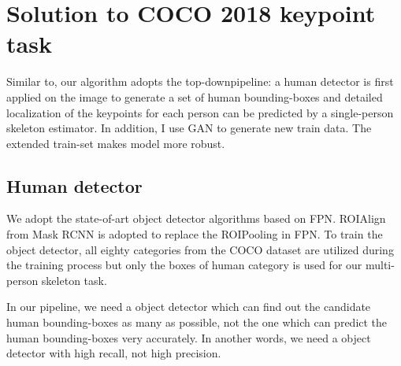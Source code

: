 \chapter{Solution to COCO 2018 keypoint task}
\label{sec:solution}
Similar to\cite{he2017mask, papandreou2017towards}, our algorithm adopts the top-downpipeline:
a human detector is first applied on the image to generate a set of human bounding-boxes and detailed localization
of the keypoints for each person can be predicted by a single-person skeleton estimator.
In addition, I use GAN to generate new train data. The extended train-set makes model more robust.

\section{Human detector}
We adopt the state-of-art object detector algorithms based on FPN\cite{lin2017feature}. ROIAlign from Mask RCNN\cite{he2017mask} is
adopted to replace the ROIPooling in FPN.
To train the object detector, all eighty categories from the COCO dataset are utilized during the training process but only the boxes of
human category is used for our multi-person skeleton task.

In our pipeline, we need a object detector which can find out the candidate human bounding-boxes as many as possible,
not the one which can predict the human bounding-boxes very accurately.
In another words, we need a object detector with high recall, not high precision.

